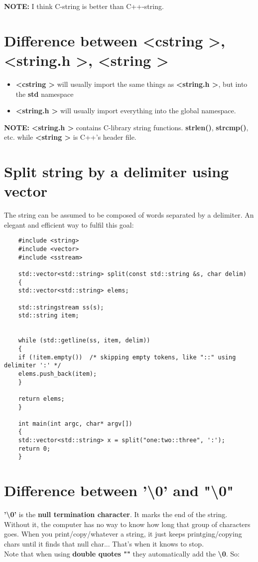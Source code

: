 	\textbf{NOTE:} I think C-string is better than C++-string.
	
	\section{Difference between \textless cstring \textgreater, \textless string.h \textgreater, \textless string \textgreater}
	\begin{itemize}
		\item \textbf{\textless cstring \textgreater} will usually import the same things as \textbf{\textless string.h \textgreater}, but into the \textbf{std} namespace
		\item \textbf{\textless string.h \textgreater} will usually import everything into the global namespace.
	\end{itemize}
	
	\textbf{NOTE:} \textbf{\textless string.h \textgreater} contains C-library string functions. \textbf{strlen()}, \textbf{strcmp()}, etc. while \textbf{\textless string \textgreater} is C++'s header file.
	
	\section{Split string by a delimiter using vector}
	The string can be assumed to be composed of words separated by a delimiter. An elegant and efficient way to fulfil this goal:
	\begin{verbatim}
	#include <string>
	#include <vector>
	#include <sstream>
	
	std::vector<std::string> split(const std::string &s, char delim) 
	{
	std::vector<std::string> elems;
	
	std::stringstream ss(s);
	std::string item;
	
	
	while (std::getline(ss, item, delim)) 
	{
	if (!item.empty())  /* skipping empty tokens, like "::" using delimiter ':' */
	elems.push_back(item);
	}
	
	return elems;
	}
	
	int main(int argc, char* argv[])
	{
	std::vector<std::string> x = split("one:two::three", ':');
	return 0;
	}
	\end{verbatim}

	\section{Difference between '\textbackslash 0' and "\textbackslash 0"}
	\textbf{'\textbackslash 0'} is the \textbf{null termination character}. It marks the end of the string. Without it, the computer has no way to know how long that group of characters goes. When you print/copy/whatever a string, it just keeps printging/copying chars until it finds that null char... That's when it knows to stop.\\	Note that when using \textbf{double quotes ""} they automatically add the \textbf{\textbackslash 0}. So:\\
	
